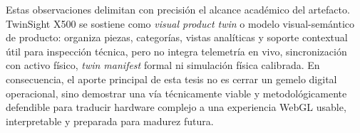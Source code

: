 Estas observaciones delimitan con precisión el alcance académico del artefacto. TwinSight X500 se sostiene como \textit{visual product twin} o modelo visual-semántico de producto: organiza piezas, categorías, vistas analíticas y soporte contextual útil para inspección técnica, pero no integra telemetría en vivo, sincronización con activo físico, \textit{twin manifest} formal ni simulación física calibrada. En consecuencia, el aporte principal de esta tesis no es cerrar un gemelo digital operacional, sino demostrar una vía técnicamente viable y metodológicamente defendible para traducir hardware complejo a una experiencia WebGL usable, interpretable y preparada para madurez futura.

\newpage
